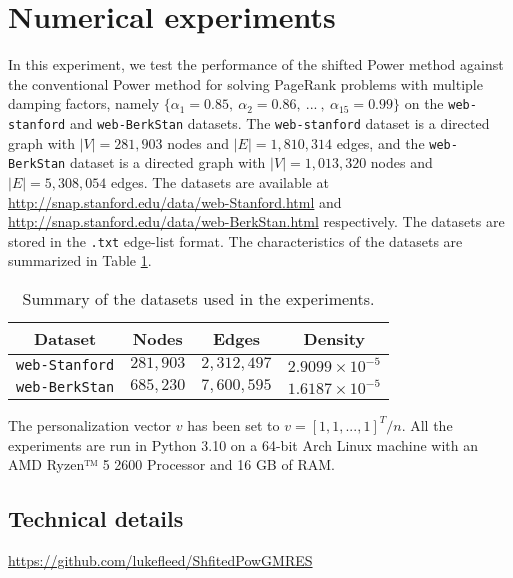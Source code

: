 
\section{Numerical experiments}\label{sec:exp}

In this experiment, we test the performance of the shifted Power method against the conventional Power method for solving PageRank problems with multiple damping factors, namely $\{ \alpha_1 = 0.85, ~\alpha_2 = 0.86, ~...~ ,~ \alpha_{15} = 0.99 \}$ on the \texttt{web-stanford} and \texttt{web-BerkStan} datasets. The \texttt{web-stanford} dataset is a directed graph with $|V| = 281,903$ nodes and $|E| = 1,810,314$ edges, and the \texttt{web-BerkStan} dataset is a directed graph with $|V| = 1, 013, 320$ nodes and $|E| = 5, 308, 054$ edges. The datasets are available at \url{http://snap.stanford.edu/data/web-Stanford.html} and \url{http://snap.stanford.edu/data/web-BerkStan.html} respectively. The datasets are stored in the \texttt{.txt} edge-list format. The characteristics of the datasets are summarized in Table \ref{tab:datasets}.

\begin{table}[h]
\centering
\begin{tabular}{|c|c|c|c|}
\hline
\textbf{Dataset} & \textbf{Nodes} & \textbf{Edges} & \textbf{Density} \\ \hline
\texttt{web-Stanford} & $281,903$ & $2,312,497$ & $2.9099 \times 10^{-5}$ \\ \hline
\texttt{web-BerkStan} & $685,230$ & $7,600,595$ & $1.6187 \times 10^{-5}$ \\ \hline
\end{tabular}
\caption{Summary of the datasets used in the experiments.}
\label{tab:datasets}
\end{table}

\noindent The personalization vector $v$ has been set to $v = [1, 1, ... , 1]^T/n$. All the experiments are run in Python 3.10 on a 64-bit Arch Linux machine with an AMD Ryzen™ 5 2600 Processor and 16 GB of RAM.

\subsection{Technical details}

\begin{problem}
    \centering
    \url{https://github.com/lukefleed/ShfitedPowGMRES}
\end{problem}

